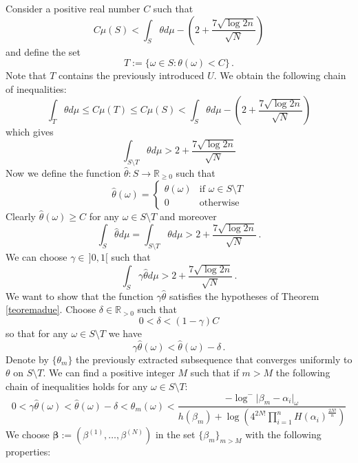 \documentclass[10 pt,a4paper]{article}
\theoremstyle{plain}
\theoremstyle{definition}
\theoremstyle{named}
\begin{document}
Consider a positive real number $C$ such that
\[
C\mu(S) < \int_S\theta d\mu - \left ( 2+ \frac{7\sqrt{\log 2n}}{\sqrt N} \right)
\]
and define the set
\[
T:=\{\omega\in S\colon \theta(\omega)< C\}\,.
\]
Note that $T$ contains the previously introduced $U$. We obtain the following chain of inequalities:
\[
\int_T \theta d\mu \le C\mu(T) \le C\mu(S) < \int_S\theta d\mu- \left ( 2+ \frac{7\sqrt{\log 2n}}{\sqrt N} \right)
\] 
which gives
\[
\int_{S\setminus T} \theta d\mu > 2+\frac{7\sqrt{\log 2n}}{\sqrt N}
\]
Now we define the function $\hat\theta: S\to \mathbb R_{\ge 0}$  such that
\begin{equation*}
\hat \theta(\omega)=\begin{cases}
\theta(\omega) & \text{if } \omega\in S\setminus T\\
0 & \text{otherwise}
\end{cases}
\end{equation*}
Clearly $\hat\theta(\omega)\ge C$ for any $\omega\in S\setminus T$ and moreover
\[
\int_{S} \hat\theta d\mu=\int_{S\setminus T} \theta d\mu > 2+\frac{7\sqrt{\log 2n}}{\sqrt N}\,.
\]
We can choose $\gamma\in\, ]0,1[$ such that
\begin{equation}\label{modification}
\int_{S}\gamma\hat\theta  d\mu > 2+\frac{7\sqrt{\log 2n}}{\sqrt N} \,.
\end{equation}
We want to show that  the function $\gamma\hat\theta$ satisfies  the hypotheses of Theorem \ref{teoremadue}. Choose $\delta\in\mathbb R_{>0}$ such that
\[
0<\delta<(1-\gamma)C
\]
so that for any $\omega\in S\setminus T $ we have
\[
\gamma\hat\theta(\omega) <\hat\theta(\omega)-\delta\,.
\]
Denote by $\{\theta_m\}$ the previously extracted subsequence that converges uniformly to $\theta$ on $S\setminus T$. We can find a positive integer $M$ such that if $m>M$ the following chain of inequalities holds for any $\omega\in S\setminus T$:
\begin{equation}\label{modification1}
0 < \gamma\hat\theta(\omega) < \hat\theta(\omega)-\delta<\theta_m(\omega)<\frac{-\log^{-}\vert\beta_{m}-\alpha_i\vert_\omega}{h(\beta_{m})+\log\left(4^{2N!}\prod^n_{i=1}H(\alpha_i)^{\frac{2N!}{n}}\right) }
\end{equation}
 We choose $\bm\beta:=(\beta^{(1)},\ldots,\beta^{(N)})$ in the set $\{\beta_m\}_{m>M}$ with the following properties:
\end{document}
